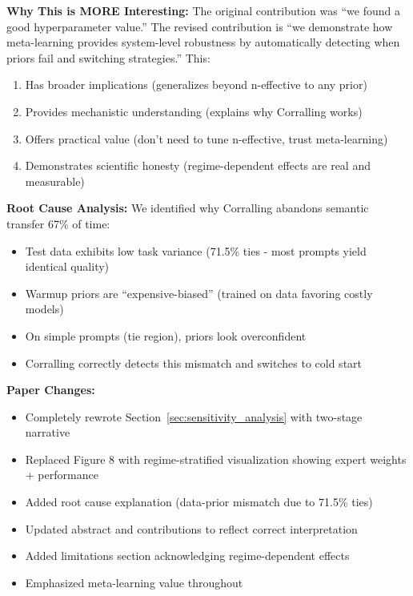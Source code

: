 \textbf{Why This is MORE Interesting:}
The original contribution was ``we found a good hyperparameter value.'' The revised contribution is ``we demonstrate how meta-learning provides system-level robustness by automatically detecting when priors fail and switching strategies.'' This:
\begin{enumerate}[leftmargin=*, itemsep=2pt]
    \item Has broader implications (generalizes beyond n-effective to any prior)
    \item Provides mechanistic understanding (explains why Corralling works)
    \item Offers practical value (don't need to tune n-effective, trust meta-learning)
    \item Demonstrates scientific honesty (regime-dependent effects are real and measurable)
\end{enumerate}

\textbf{Root Cause Analysis:} We identified why Corralling abandons semantic transfer 67\% of time:
\begin{itemize}[leftmargin=*, itemsep=2pt]
    \item Test data exhibits low task variance (71.5\% ties - most prompts yield identical quality)
    \item Warmup priors are ``expensive-biased'' (trained on data favoring costly models)
    \item On simple prompts (tie region), priors look overconfident
    \item Corralling correctly detects this mismatch and switches to cold start
\end{itemize}

\textbf{Paper Changes:}
\begin{itemize}[leftmargin=*, itemsep=2pt]
    \item Completely rewrote Section~\ref{sec:sensitivity_analysis} with two-stage narrative
    \item Replaced Figure 8 with regime-stratified visualization showing expert weights + performance
    \item Added root cause explanation (data-prior mismatch due to 71.5\% ties)
    \item Updated abstract and contributions to reflect correct interpretation
    \item Added limitations section acknowledging regime-dependent effects
    \item Emphasized meta-learning value throughout
\end{itemize}

